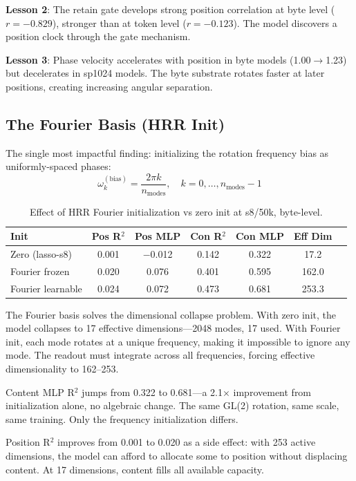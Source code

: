 \documentclass[11pt,a4paper]{article}
\begin{document}
\textbf{Lesson 2}: The retain gate develops strong position correlation at byte level ($r = -0.829$), stronger than at token level ($r = -0.123$). The model discovers a position clock through the gate mechanism.

\textbf{Lesson 3}: Phase velocity accelerates with position in byte models (1.00$\to$1.23) but decelerates in sp1024 models. The byte substrate rotates faster at later positions, creating increasing angular separation.

\subsection{The Fourier Basis (HRR Init)}

The single most impactful finding: initializing the rotation frequency bias as uniformly-spaced phases:
\begin{equation}
\omega_k^{(\text{bias})} = \frac{2\pi k}{n_{\text{modes}}}, \quad k = 0, \ldots, n_{\text{modes}}-1
\end{equation}

\begin{table}[h]
\centering
\caption{Effect of HRR Fourier initialization vs zero init at s8/50k, byte-level.}
\begin{tabular}{lcccccc}
\toprule
Init & Pos R$^2$ & Pos MLP & Con R$^2$ & Con MLP & Eff Dim \\
\midrule
Zero (lasso-s8) & 0.001 & $-$0.012 & 0.142 & 0.322 & 17.2 \\
Fourier frozen & 0.020 & 0.076 & 0.401 & 0.595 & 162.0 \\
Fourier learnable & 0.024 & 0.072 & 0.473 & 0.681 & 253.3 \\
\bottomrule
\end{tabular}
\label{tab:hrr}
\end{table}

The Fourier basis solves the dimensional collapse problem. With zero init, the model collapses to 17 effective dimensions---2048 modes, 17 used. With Fourier init, each mode rotates at a unique frequency, making it impossible to ignore any mode. The readout must integrate across all frequencies, forcing effective dimensionality to 162--253.

Content MLP R$^2$ jumps from 0.322 to 0.681---a 2.1$\times$ improvement from initialization alone, no algebraic change. The same GL(2) rotation, same scale, same training. Only the frequency initialization differs.

Position R$^2$ improves from 0.001 to 0.020 as a side effect: with 253 active dimensions, the model can afford to allocate some to position without displacing content. At 17 dimensions, content fills all available capacity.
\end{document}
